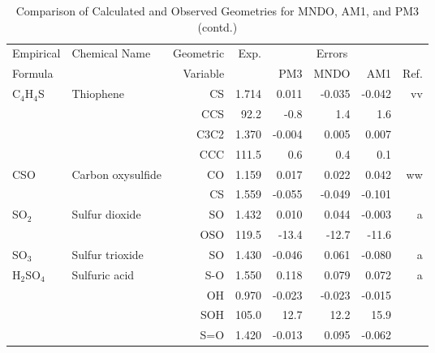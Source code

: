 \begin{table}
\caption{\label{geotabg}Comparison of Calculated and Observed Geometries for 
MNDO, AM1, and PM3 (contd.)}
\begin{center}
\compresstable
\begin{tabular}{llrrrrrr}
 Empirical  & Chemical Name &  Geometric &  Exp. & \multicolumn{3}{c}{Errors} & \\
  Formula   &               &  Variable &        & PM3  & MNDO  &  AM1 & Ref.\\
\hline
 C$_4$H$_4$S       & Thiophene                          &CS            &     1.714   &     0.011 &    -0.035 &    -0.042 &    vv \\
             &                                    &CCS         &      92.2   &      -0.8 &       1.4 &       1.6   &       \\
             &                                    &C3C2          &     1.370   &    -0.004 &     0.005 &     0.007 &       \\
             &                                    &CCC         &     111.5   &       0.6 &       0.4 &       0.1   &       \\
 CSO         & Carbon oxysulfide                  &CO            &     1.159   &     0.017 &     0.022 &     0.042 &    ww \\
             &                                    &CS            &     1.559   &    -0.055 &    -0.049 &    -0.101 &       \\
 SO$_2$         & Sulfur dioxide                     &SO            &     1.432   &     0.010 &     0.044 &    -0.003 &     a \\
             &                                    &OSO         &     119.5   &     -13.4 &     -12.7 &     -11.6   &       \\
 SO$_3$         & Sulfur trioxide                    &SO            &     1.430   &    -0.046 &     0.061 &    -0.080 &     a \\
 H$_2$SO$_4$       & Sulfuric acid                      &S-O           &     1.550   &     0.118 &     0.079 &     0.072 &     a \\
             &                                    &OH            &     0.970   &    -0.023 &    -0.023 &    -0.015 &       \\
             &                                    &SOH         &     105.0   &      12.7 &      12.2 &      15.9   &       \\
             &                                    &S=O           &     1.420   &    -0.013 &     0.095 &    -0.062 &       \\

\end{tabular}
\end{center}
\end{table}
